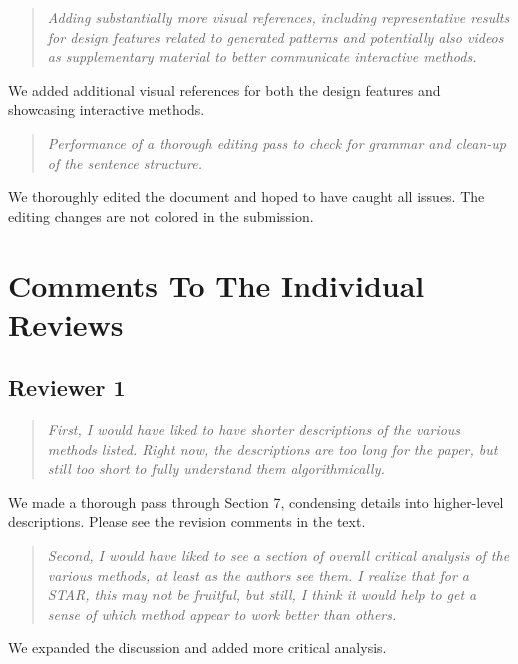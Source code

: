 \documentclass{egpubl}
\newcommand{\rev}[2]{{\color{greenrev}\textsuperscript{#1}#2}}
\renewcommand{\rev}[2]{{#2}}
\begin{document}
\begin{quote}
\emph{
    Adding substantially more visual references, including representative results for design features related to generated patterns and potentially also videos as supplementary material to better communicate interactive methods.
    }
\end{quote}


\rev{}{We added additional visual references for both the design features and showcasing interactive methods.}

\begin{quote}
\emph{
    Performance of a thorough editing pass to check for grammar and clean-up of the sentence structure.
    }
\end{quote}


\rev{}{We thoroughly edited the document and hoped to have caught all issues. The editing changes are not colored in the submission.}


\section*{Comments To The Individual Reviews}

\subsection*{Reviewer 1} 

\begin{quote}
\emph{First, I would have liked to have shorter descriptions of the various methods listed. Right now, the descriptions are too long for the paper, but still too short to fully understand them algorithmically.}
\end{quote}

\rev{}{We made a thorough pass through Section 7, condensing details into higher-level descriptions. Please see the revision comments in the text.}


\begin{quote}
\emph{Second, I would have liked to see a section of overall critical analysis of the various methods, at least as the authors see them. I realize that for a STAR, this may not be fruitful, but still, I think it would help to get a sense of which method appear to work better than others.}
\end{quote}


\rev{}{We expanded the discussion and added more critical analysis.}
\end{document}
